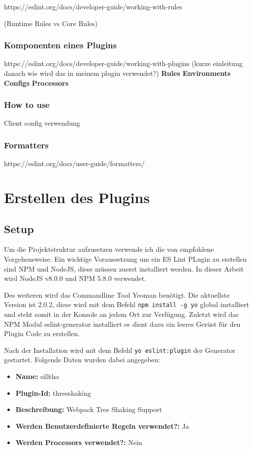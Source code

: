 https://eslint.org/docs/developer-guide/working-with-rules

(Runtime Rules vs Core Rules)

\subsubsection{Komponenten eines Plugins}
https://eslint.org/docs/developer-guide/working-with-plugins
(kurze einleitung  danach wie wird das in meinem plugin verwendet?)
\textbf{Rules}
\textbf{Environments}
\textbf{Configs}
\textbf{Processors}

\subsubsection{How to use}
Client config verwendung

\subsubsection{Formatters}
https://eslint.org/docs/user-guide/formatters/

\section{Erstellen des Plugins}
\subsection{Setup}
Um die Projektstruktur aufzusetzen verwende ich die von \textcite{ESLintNewRules} empfohlene Vorgehensweise. Ein wichtige Voraussetzung um ein ES Lint PLugin zu erstellen sind NPM und NodeJS, diese müssen zuerst installiert werden. In dieser Arbeit wird NodeJS v8.0.0 und NPM 5.8.0 verwendet.

Des weiteren wird das Commandline Tool Yeoman benötigt. Die aktuellste Version ist 2.0.2, diese wird mit dem Befehl \lstinline{npm install -g yo} global installiert und steht somit in der Konsole an jedem Ort zur Verfügung. Zuletzt wird das NPM Modul eslint-generator installiert es dient dazu ein leeres Gerüst für den Plugin Code zu erstellen.

Nach der Installation wird mit dem Befehl \lstinline{yo eslint:plugin} der Generator gestartet. Folgende Daten wurden dabei angegeben:
\begin{itemize}
	\item \textbf{Name:} silltho
    \item \textbf{Plugin-Id:} threeshaking
    \item \textbf{Beschreibung:} Webpack Tree Shaking Support
    \item \textbf{Werden Benutzerdefinierte Regeln verwendet?:} Ja
    \item \textbf{Werden Processors verwendet?:} Nein
\end{itemize}


